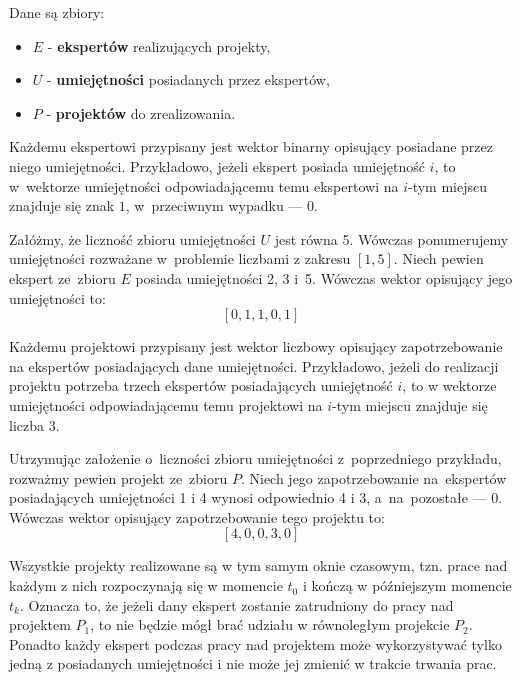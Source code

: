 \documentclass[12pt,a4paper]{article}
\theoremstyle{definition}
\begin{document}
\noindent
Dane są zbiory:
\begin{itemize}
	\item $E$ - \textbf{ekspertów} realizujących projekty,
	\item $U$ - \textbf{umiejętności} posiadanych przez ekspertów,
	\item $P$ - \textbf{projektów} do zrealizowania.\\
\end{itemize}

\noindent
Każdemu ekspertowi przypisany jest wektor binarny opisujący posiadane przez niego umiejętności. Przykładowo, jeżeli ekspert posiada umiejętność $i$, to w~wektorze umiejętności odpowiadającemu temu ekspertowi na $i$-tym miejscu znajduje się znak $1$, w~przeciwnym wypadku --- $0$.\\

\begin{tcolorbox}[title=Przykład --- wektory ekspertów]
Załóżmy, że liczność zbioru umiejętności $U$ jest równa 5. Wówczas ponumerujemy umiejętności rozważane w~problemie liczbami z zakresu $[1, 5]$. Niech pewien ekspert ze~zbioru $E$ posiada umiejętności 2, 3 i~5. Wówczas wektor opisujący jego umiejętności to:
$$[0, 1, 1, 0, 1]$$
\end{tcolorbox}

\vspace{0.5em}
\noindent
Każdemu projektowi przypisany jest wektor liczbowy opisujący zapotrzebowanie na ekspertów posiadających dane umiejętności. Przykładowo, jeżeli do realizacji projektu potrzeba trzech ekspertów posiadających umiejętność $i$, to w wektorze umiejętności odpowiadającemu temu projektowi na $i$-tym miejscu znajduje się liczba $3$.\\

\begin{tcolorbox}[title=Przykład --- wektory zapotrzebowania projektów]
Utrzymując założenie o~liczności zbioru umiejętności z~poprzedniego przykładu, rozważmy pewien projekt ze~zbioru $P$. Niech jego zapotrzebowanie na~ekspertów posiadających umiejętności 1 i 4 wynosi odpowiednio 4 i 3, a~na~pozostałe --- 0. Wówczas wektor opisujący zapotrzebowanie tego projektu to:
$$[4, 0, 0, 3, 0]$$
\end{tcolorbox}

\vspace{0.5em}
\noindent
Wszystkie projekty realizowane są w tym samym oknie czasowym, tzn. prace nad każdym z nich rozpoczynają się w momencie $t_0$ i kończą w późniejszym momencie $t_k$. Oznacza to, że jeżeli dany ekspert zostanie zatrudniony do pracy nad projektem $P_1$, to nie będzie mógł brać udziału w równoległym projekcie $P_2$. Ponadto każdy ekspert podczas pracy nad projektem może wykorzystywać tylko jedną z posiadanych umiejętności i nie może jej zmienić w trakcie trwania prac.\\
\end{document}
